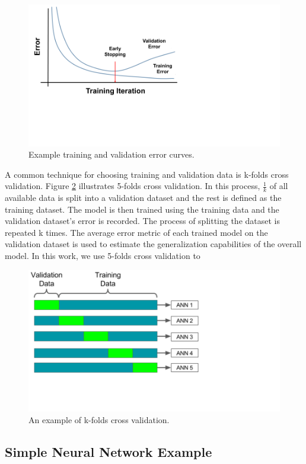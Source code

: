 \begin{figure}[H]
	\centering
	\includegraphics[trim=0 190 390 0,clip,width=0.7\linewidth]{images/training_testing_error_v2}
	\caption{Example training and validation error curves.}
	\label{fig:training_testing_error}
\end{figure}

A common technique for choosing training and validation data is k-folds cross validation. Figure \ref{fig:kfolds} illustrates 5-folds cross validation. In this process, $\frac{1}{k}$ of all available data is split into a validation dataset and the rest is defined as the training dataset. The model is then trained using the training data and the validation dataset's error is recorded. The process of splitting the dataset is repeated k times. The average error metric of each trained model on the validation dataset is used to estimate the generalization capabilities of the overall model. In this work, we use 5-folds cross validation to 


\begin{figure}[H]
	\centering
	\includegraphics[trim=0 140 310 0,clip,width=0.7\linewidth]{images/kfolds}
	\caption{An example of k-folds cross validation.}
	\label{fig:kfolds}
\end{figure}

\subsection{Simple Neural Network Example}

